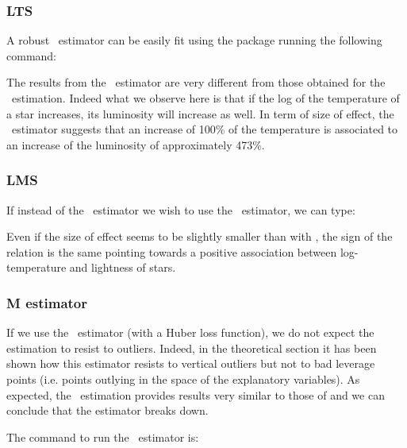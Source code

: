 \subsubsection{LTS}

A robust ~estimator can be easily fit using the  package 
running the following command:

\begin{stlog}

\end{stlog}

The results from the ~estimator are very different from those
obtained for the ~estimation. Indeed what we observe here is that if
the log of the temperature of a star increases, its luminosity will increase as
well. In term of size of effect, the ~estimator suggests that an
increase of 100\% of the temperature is associated to an increase of the
luminosity of approximately 473\%.

\subsubsection{LMS}

If instead of the ~estimator we wish to use the ~estimator,
we can type:

\begin{stlog}

\end{stlog}

Even if the size of effect seems to be slightly smaller than with ,
the sign of the relation is the same pointing towards a positive association
between log-temperature and lightness of stars.

\subsubsection{M estimator}

If we use the ~estimator (with a Huber
loss function), we do not expect the estimation to resist to outliers. Indeed, 
in the theoretical section it has been shown how this
estimator resists to vertical outliers but not to bad leverage points (i.e.
points outlying in the space of the explanatory variables). As expected, the
~estimation provides results very similar to those of  and we can conclude
that the estimator breaks down.

The command to run the ~estimator is:

\begin{stlog}

\end{stlog}

